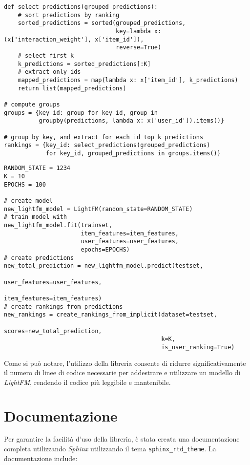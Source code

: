 \begin{lstlisting}[caption=esempio di utilizzo completo della libreria \textit{LightFM}]
def select_predictions(grouped_predictions):
    # sort predictions by ranking
    sorted_predictions = sorted(grouped_predictions, 
                                key=lambda x: (x['interaction_weight'], x['item_id']), 
                                reverse=True)
    # select first k
    k_predictions = sorted_predictions[:K]
    # extract only ids
    mapped_predictions = map(lambda x: x['item_id'], k_predictions)
    return list(mapped_predictions)

# compute groups
groups = {key_id: group for key_id, group in 
          groupby(predictions, lambda x: x['user_id']).items()}

# group by key, and extract for each id top k predictions
rankings = {key_id: select_predictions(grouped_predictions)
            for key_id, grouped_predictions in groups.items()}
\end{lstlisting}

\begin{lstlisting}[caption=esempio di utilizzo del modello \texttt{LightFM} libreria]
RANDOM_STATE = 1234
K = 10
EPOCHS = 100

# create model
new_lightfm_model = LightFM(random_state=RANDOM_STATE)
# train model with
new_lightfm_model.fit(trainset, 
                      item_features=item_features,
                      user_features=user_features, 
                      epochs=EPOCHS)
# create predictions
new_total_prediction = new_lightfm_model.predict(testset, 
                                                 user_features=user_features,
                                                 item_features=item_features)
# create rankings from predictions
new_rankings = create_rankings_from_implicit(dataset=testset,
                                             scores=new_total_prediction, 
                                             k=K, 
                                             is_user_ranking=True)
\end{lstlisting}

Come si può notare, l'utilizzo della libreria consente di ridurre significativamente il numero di linee di codice necessarie per addestrare e utilizzare un modello di \textit{LightFM}, rendendo il codice più leggibile e mantenibile.

\section{Documentazione}
Per garantire la facilità d'uso della libreria, è stata creata una documentazione completa utilizzando \textit{Sphinx} utilizzando il tema \texttt{sphinx\_rtd\_theme}. La documentazione include:

